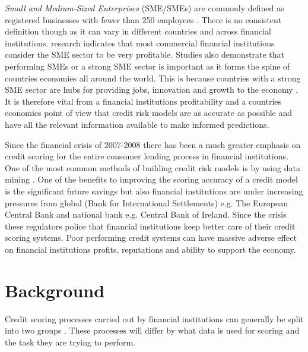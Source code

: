 \textit{Small and Medium-Sized Enterprises} (SME/SMEs) are commonly defined as registered businesses with fewer than 250 employees \citep{ifc_sme_2009}. There is no consistent definition though as it can vary in different countries and across financial institutions. \cite{beck_bank_2008} research indicates that most commercial financial institutions consider the SME sector to be very profitable. Studies also demonstrate that performing SMEs or a strong SME sector is important as it forms the spine of countries economies all around the world. This is because countries with a strong SME sector are hubs for providing jobs, innovation and growth to the economy \citep{craig_sba-guaranteed_2004}. It is therefore vital from a financial institutions profitability and a countries economies point of view that credit risk models are as accurate as possible and have all the relevant information available to make informed predictions.

Since the financial crisis of 2007-2008 there has been a much greater emphasis on credit scoring for the entire consumer lending process in financial institutions. One of the most common methods of building credit risk models is by using data mining \citep{baesens_50_2009}. One of the benefits to improving the scoring accuracy of a credit model is the significant future savings \citep{west_neural_2000} but also financial institutions are under increasing pressures from global (Bank for International Settlements) e.g. The European Central Bank and national bank e.g. Central Bank of Ireland. Since the crisis these regulators police that financial institutions keep better care of their credit scoring systems. Poor performing credit systems can have massive adverse effect on financial institutions profits, reputations and ability to support the economy.


\section{Background}

Credit scoring processes carried out by financial institutions can generally be split into two groups \citep{bijak_does_2012}. These processes will differ by what data is used for scoring and the task they are trying to perform. 


